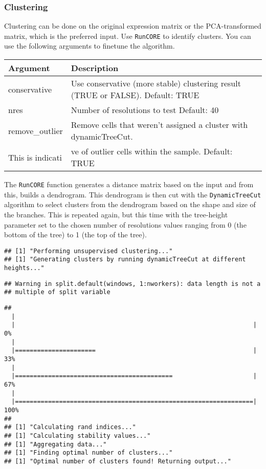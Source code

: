 \documentclass[]{article}
\begin{document}
\hypertarget{clustering}{%
\subsubsection{Clustering}\label{clustering}}

Clustering can be done on the original expression matrix or the
PCA-transformed matrix, which is the preferred input. Use
\texttt{RunCORE} to identify clusters. You can use the following
arguments to finetune the algorithm.

\begin{longtable}[]{@{}ll@{}}
\toprule
Argument & Description\tabularnewline
\midrule
\endhead
conservative & Use conservative (more stable) clustering result (TRUE or
FALSE). Default: TRUE\tabularnewline
nres & Number of resolutions to test Default: 40\tabularnewline
remove\_outlier & Remove cells that weren't assigned a cluster with
dynamicTreeCut.\tabularnewline
This is indicati & ve of outlier cells within the sample. Default:
TRUE\tabularnewline
\bottomrule
\end{longtable}

The \texttt{RunCORE} function generates a distance matrix based on the
input and from this, builds a dendrogram. This dendrogram is then cut
with the \texttt{DynamicTreeCut} algorithm to select clusters from the
dendrogram based on the shape and size of the branches. This is repeated
again, but this time with the tree-height parameter set to the chosen
number of resolutions values ranging from 0 (the bottom of the tree) to
1 (the top of the tree).

\begin{verbatim}
## [1] "Performing unsupervised clustering..."
## [1] "Generating clusters by running dynamicTreeCut at different heights..."
\end{verbatim}

\begin{verbatim}
## Warning in split.default(windows, 1:nworkers): data length is not a
## multiple of split variable
\end{verbatim}

\begin{verbatim}
## 
  |                                                                       
  |                                                                 |   0%
  |                                                                       
  |======================                                           |  33%
  |                                                                       
  |===========================================                      |  67%
  |                                                                       
  |=================================================================| 100%
## 
## [1] "Calculating rand indices..."
## [1] "Calculating stability values..."
## [1] "Aggregating data..."
## [1] "Finding optimal number of clusters..."
## [1] "Optimal number of clusters found! Returning output..."
\end{verbatim}
\end{document}
